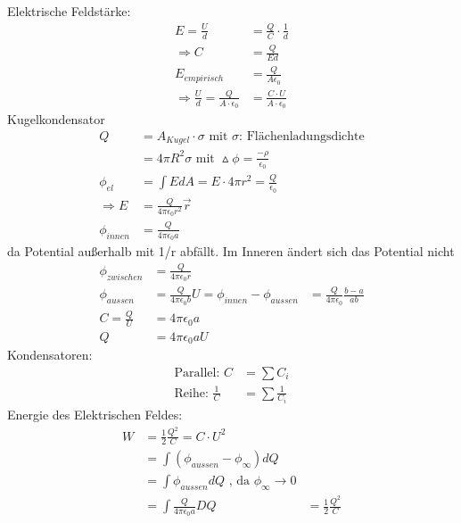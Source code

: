 \documentclass[10pt,a4paper]{article}
\begin{document}
Elektrische Feldstärke:
\begin{align}
E = \frac{U}{d} &= \frac{Q}{C} \cdot \frac{1}{d}\\
\Rightarrow C &= \frac{Q}{E d}\\
E_{empirisch} &= \frac{Q}{A \epsilon_0}\\
\Rightarrow \frac{U}{d} = \frac{Q}{A\cdot\epsilon_0} &= \frac{C\cdot U}{A \cdot \epsilon_0}
\end{align}
Kugelkondensator
\begin{align}
Q &= A_{Kugel} \cdot \sigma\text{ mit $\sigma$: Flächenladungsdichte}\\
&=4\pi R^2 \sigma \text{ mit } \vartriangle \phi = \frac{-\rho}{\epsilon_0}\\
\phi_{el} &= \int{E dA} =E \cdot 4 \pi r^2 = \frac{Q}{\epsilon_0}\\
\Rightarrow E &= \frac{Q}{4\pi\epsilon_0r^2} \vec{r}\\
\phi_{innen} &= \frac{Q}{4\pi\epsilon_0 a}
\end{align}
da Potential außerhalb mit 1/r abfällt. Im Inneren ändert sich das Potential nicht
\begin{align}
\phi_{zwischen} &= \frac{Q}{4\pi\epsilon_0 r}\\
\phi_{aussen} &= \frac{Q}{4\pi\epsilon_0 b}
U = \phi_{innen} - \phi_{aussen} &= \frac{Q}{4\pi\epsilon_0}\frac{b-a}{ab}\\
C=\frac{Q}{U}&= 4\pi\epsilon_0 a\\
Q &= 4\pi\epsilon_0 a U
\end{align}
Kondensatoren:
\begin{align}
\text{Parallel: } C &= \sum{C_i}\\
\text{Reihe: } \frac{1}{C} &= \sum{\frac{1}{C_i}}
\end{align}
Energie des Elektrischen Feldes:
\begin{align}
W &= \frac{1}{2} \frac{Q^2}{C} = C\cdot U^2\\
&= \int{(\phi_{aussen} - \phi_{\infty}) dQ}\\
&= \int{\phi_{aussen} dQ} \text{ , da }\phi_{\infty} \rightarrow 0\\
&= \int{\frac{Q}{4\pi\epsilon_0a} DQ}
&= \frac{1}{2} \frac{Q^2}{C}
\end{align}
\end{document}
